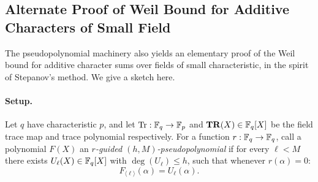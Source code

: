 \subsection{Alternate Proof of Weil Bound for Additive Characters of Small Field}

The pseudopolynomial machinery also yields an elementary proof of the Weil bound for additive character sums over fields of small characteristic, in the spirit of Stepanov's method. We give a sketch here.

\paragraph*{Setup.}
Let $q$ have characteristic $p$, and let $\operatorname{Tr} : \mathbb{F}_q \to \mathbb{F}_p$ and $\mathbf{TR}(X) \in \mathbb{F}_q[X]$ be the field trace map and trace polynomial respectively. For a function $r : \mathbb{F}_q \to \mathbb{F}_q$, call a polynomial $F(X)$ an \emph{$r$-guided $(h,M)$-pseudopolynomial} if for every $\ell < M$ there exists $U_\ell(X) \in \mathbb{F}_q[X]$ with $\deg(U_\ell) \leq h$, such that whenever $r(\alpha) = 0$:
\[
  F_{\langle\ell\rangle}(\alpha) = U_\ell(\alpha).
\]